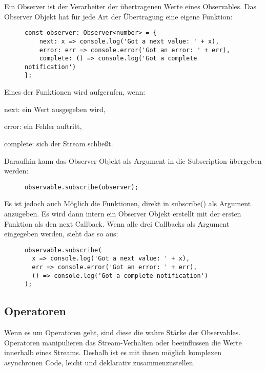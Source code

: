Ein Observer ist der Verarbeiter der übertragenen Werte eines Observables. Das Observer Objekt hat für jede Art der Übertragung eine eigene Funktion:

\begin{figure}[H]
\begin{lstlisting}[basicstyle=\small]
const observer: Observer<number> = {
    next: x => console.log('Got a next value: ' + x),
    error: err => console.error('Got an error: ' + err),
    complete: () => console.log('Got a complete notification')
};
\end{lstlisting}
\end{figure}

\noindent
Eines der Funktionen wird aufgerufen, wenn:

\begin{description}
\item next: ein Wert ausgegeben wird,
\item error: ein Fehler auftritt,
\item complete: sich der Stream schließt.
\end{description}

\noindent
Daraufhin kann das Observer Objekt als Argument in die Subscription übergeben werden:

\begin{figure}[H]
\begin{lstlisting}[basicstyle=\small]
observable.subscribe(observer);
\end{lstlisting}
\end{figure}

\noindent
Es ist jedoch auch Möglich die Funktionen, direkt in subscribe() als Argument anzugeben. Es wird dann intern ein Observer Objekt erstellt mit der ersten Funktion als den next Callback. Wenn alle drei Callbacks als Argument eingegeben werden, sieht das so aus:

\begin{figure}[H]
\begin{lstlisting}[basicstyle=\small]
observable.subscribe(
  x => console.log('Got a next value: ' + x),
  err => console.error('Got an error: ' + err),
  () => console.log('Got a complete notification')
);
\end{lstlisting}
\end{figure}

\subsection{Operatoren}
Wenn es um Operatoren geht, sind diese die wahre Stärke der Observables. Operatoren manipulieren das Stream-Verhalten oder beeinflussen die Werte innerhalb eines Streams. Deshalb ist es mit ihnen möglich komplexen asynchronen Code, leicht und deklarativ zusammenzustellen.\\

